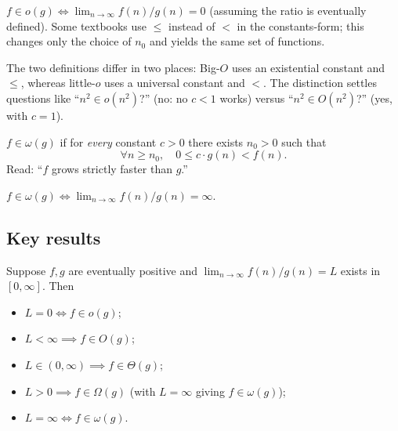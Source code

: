 \begin{remark}
$f \in o(g) \iff \lim_{n \to \infty} f(n)/g(n) = 0$ (assuming the ratio is eventually defined). Some textbooks use $\le$ instead of $<$ in the constants-form; this changes only the choice of $n_0$ and yields the same set of functions.
\end{remark}

\begin{remark}[$O$ versus $o$]
The two definitions differ in two places: Big-$O$ uses an existential constant and $\le$, whereas little-$o$ uses a universal constant and $<$. The distinction settles questions like ``$n^2 \in o(n^2)$?'' (no: no $c < 1$ works) versus ``$n^2 \in O(n^2)$?'' (yes, with $c = 1$).
\end{remark}

\begin{definition}
\label{def:little_omega}
$f \in \omega(g)$ if for \emph{every} constant $c > 0$ there exists $n_0 > 0$ such that
\[
  \forall n \ge n_0,\quad 0 \le c \cdot g(n) < f(n).
\]
Read: ``$f$ grows strictly faster than $g$.''
\end{definition}

\begin{remark}
$f \in \omega(g) \iff \lim_{n \to \infty} f(n)/g(n) = \infty$.
\end{remark}

\subsection{Key results}

\begin{theorem}
\label{thm:asymp_limit_equivalence}
Suppose $f, g$ are eventually positive and $\lim_{n \to \infty} f(n)/g(n) = L$ exists in $[0, \infty]$. Then
\begin{itemize}
  \item $L = 0 \iff f \in o(g)$;
  \item $L < \infty \implies f \in O(g)$;
  \item $L \in (0, \infty) \implies f \in \Theta(g)$;
  \item $L > 0 \implies f \in \Omega(g)$ (with $L = \infty$ giving $f \in \omega(g)$);
  \item $L = \infty \iff f \in \omega(g)$.
\end{itemize}
\end{theorem}


